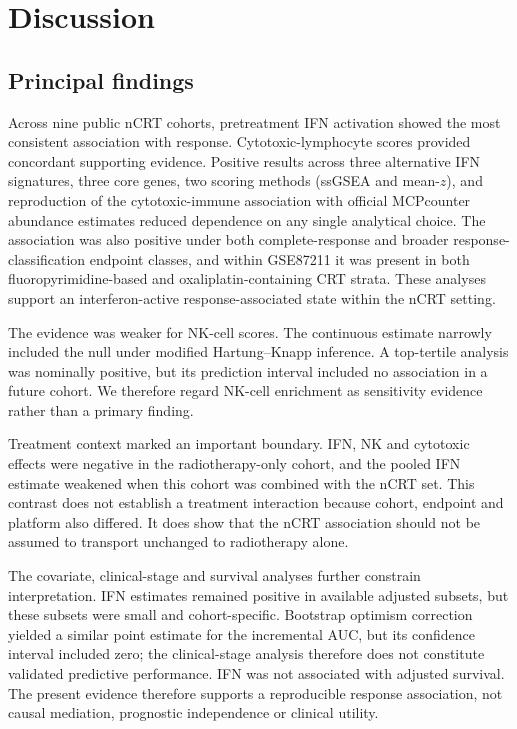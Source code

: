 \documentclass[11pt,a4paper]{article}
\begin{document}
\section{Discussion}

\subsection{Principal findings}

Across nine public nCRT cohorts, pretreatment IFN activation showed the most consistent association with response. Cytotoxic-lymphocyte scores provided concordant supporting evidence. Positive results across three alternative IFN signatures, three core genes, two scoring methods (ssGSEA and mean-$z$), and reproduction of the cytotoxic-immune association with official MCPcounter abundance estimates reduced dependence on any single analytical choice. The association was also positive under both complete-response and broader response-classification endpoint classes, and within GSE87211 it was present in both fluoropyrimidine-based and oxaliplatin-containing CRT strata. These analyses support an interferon-active response-associated state within the nCRT setting.

The evidence was weaker for NK-cell scores. The continuous estimate narrowly included the null under modified Hartung--Knapp inference. A top-tertile analysis was nominally positive, but its prediction interval included no association in a future cohort. We therefore regard NK-cell enrichment as sensitivity evidence rather than a primary finding.

Treatment context marked an important boundary. IFN, NK and cytotoxic effects were negative in the radiotherapy-only cohort, and the pooled IFN estimate weakened when this cohort was combined with the nCRT set. This contrast does not establish a treatment interaction because cohort, endpoint and platform also differed. It does show that the nCRT association should not be assumed to transport unchanged to radiotherapy alone.

The covariate, clinical-stage and survival analyses further constrain interpretation. IFN estimates remained positive in available adjusted subsets, but these subsets were small and cohort-specific. Bootstrap optimism correction yielded a similar point estimate for the incremental AUC, but its confidence interval included zero; the clinical-stage analysis therefore does not constitute validated predictive performance. IFN was not associated with adjusted survival. The present evidence therefore supports a reproducible response association, not causal mediation, prognostic independence or clinical utility.
\end{document}
